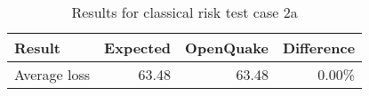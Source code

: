 \begin{table}[htbp]

\centering
\begin{tabular}{ l r r r }

\hline
\rowcolor{anti-flashwhite}
\bf{Result} & \bf{Expected} & \bf{OpenQuake} & \bf{Difference}\\
\hline
Average loss & 63.48 & 63.48 & 0.00\% \\
\hline
\end{tabular}

\caption{Results for classical risk test case 2a}
\label{tab:result-cr-2a}
\end{table}